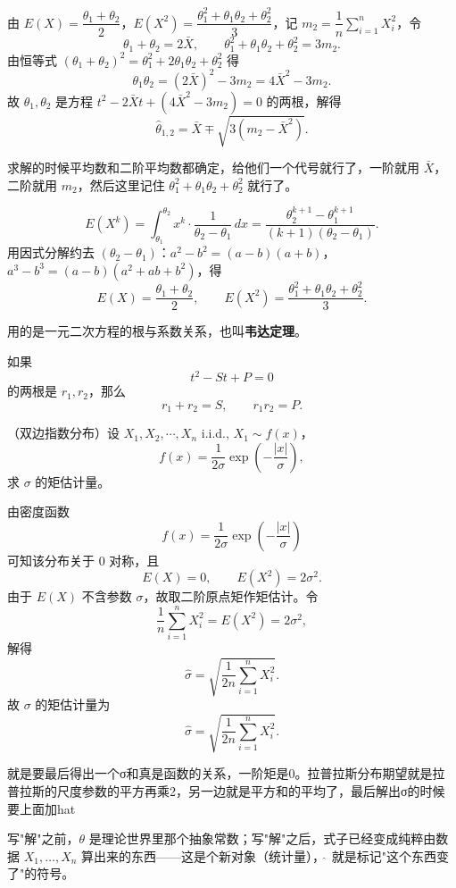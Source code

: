 \begin{solution}
由 \(E(X)=\dfrac{\theta_1+\theta_2}{2}\)，\(E(X^2)=\dfrac{\theta_1^2+\theta_1\theta_2+\theta_2^2}{3}\)，记 \(m_2=\dfrac1n\displaystyle\sum_{i=1}^n X_i^2\)，令
\[
\theta_1+\theta_2=2\bar X,\qquad \theta_1^2+\theta_1\theta_2+\theta_2^2=3m_2.
\]
由恒等式 \((\theta_1+\theta_2)^2=\theta_1^2+2\theta_1\theta_2+\theta_2^2\) 得
\[
\theta_1\theta_2=(2\bar X)^2-3m_2=4\bar X^2-3m_2.
\]
故 \(\theta_1,\theta_2\) 是方程 \(t^2-2\bar Xt+(4\bar X^2-3m_2)=0\) 的两根，解得
\[
\hat\theta_{1,2}=\bar X\mp\sqrt{3\left(m_2-\bar X^2\right)}.
\]
\end{solution}
\begin{dxtips}
  求解的时候平均数和二阶平均数都确定，给他们一个代号就行了，一阶就用 $\bar{X}$，二阶就用 $m_2$，然后这里记住 $\theta_1^2 + \theta_1\theta_2 + \theta_2^2$ 就行了。
\end{dxtips}
\begin{note}[U(θ₁,θ₂)的矩]
\[
E(X^k)=\int_{\theta_1}^{\theta_2}x^k\cdot\frac{1}{\theta_2-\theta_1}\,dx=\frac{\theta_2^{k+1}-\theta_1^{k+1}}{(k+1)(\theta_2-\theta_1)}.
\]
用因式分解约去 \((\theta_2-\theta_1)\)：\(a^2-b^2=(a-b)(a+b)\)，\(a^3-b^3=(a-b)(a^2+ab+b^2)\)，得
\[
E(X)=\frac{\theta_1+\theta_2}{2},\qquad E(X^2)=\frac{\theta_1^2+\theta_1\theta_2+\theta_2^2}{3}.
\]
\end{note}
\begin{note}
用的是一元二次方程的根与系数关系，也叫\textbf{韦达定理}。

如果
\[
t^2-St+P=0
\]
的两根是 \(r_1,r_2\)，那么
\[
r_1+r_2=S,\qquad r_1r_2=P.
\]
\end{note}
\begin{homework}[5]
（双边指数分布）设 \(X_1,X_2,\cdots,X_n\) i.i.d., \(X_1\sim f(x)\)，
\[
f(x)=\frac{1}{2\sigma}\exp\!\left(-\frac{|x|}{\sigma}\right),
\]
求 \(\sigma\) 的矩估计量。
\end{homework}
\begin{solution}
由密度函数
\[
f(x)=\frac{1}{2\sigma}\exp\!\left(-\frac{|x|}{\sigma}\right)
\]
可知该分布关于 \(0\) 对称，且
\[
E(X)=0,\qquad E(X^2)=2\sigma^2.
\]
由于 \(E(X)\) 不含参数 \(\sigma\)，故取二阶原点矩作矩估计。令
\[
\frac{1}{n}\sum_{i=1}^n X_i^2=E(X^2)=2\sigma^2,
\]
解得
\[
\hat{\sigma}
=\sqrt{\frac{1}{2n}\sum_{i=1}^n X_i^2 }.
\]
故 \(\sigma\) 的矩估计量为
\[
\hat{\sigma}=\sqrt{\frac{1}{2n}\sum_{i=1}^n X_i^2 }.
\]
\end{solution}
\begin{dxtips}
    就是要最后得出一个σ和真是函数的关系，一阶矩是0。拉普拉斯分布期望就是拉普拉斯的尺度参数的平方再乘2，另一边就是平方和的平均了，最后解出σ的时候要上面加hat
\end{dxtips}
\begin{note}
写"解"之前，\(\theta\) 是理论世界里那个抽象常数；写"解"之后，式子已经变成纯粹由数据 \(X_1,\dots,X_n\) 算出来的东西——这是个新对象（统计量），\(\hat{\ }\) 就是标记"这个东西变了"的符号。
\end{note}
